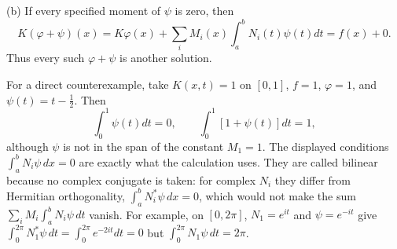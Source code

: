 (b) If every specified moment of $\psi$ is zero, then
\[
K(\varphi+\psi)(x)
=K\varphi(x)+\sum_iM_i(x)\int_a^bN_i(t)\psi(t)dt
=f(x)+0.
\]
Thus every such $\boxed{\varphi+\psi}$ is another solution.

For a direct counterexample, take $K(x,t)=1$ on $[0,1]$,
$f=1$, $\varphi=1$, and $\psi(t)=t-\tfrac12$. Then
\[
\int_0^1\psi(t)dt=0,\qquad
\int_0^1[1+\psi(t)]dt=1,
\]
although $\psi$ is not in the span of the constant $M_1=1$.
The displayed conditions $\int_a^bN_i\psi\,dx=0$ are exactly what the
calculation uses. They are called bilinear because no complex conjugate
is taken: for complex $N_i$ they differ from Hermitian orthogonality,
$\int_a^bN_i^*\psi\,dx=0$, which would not make the sum
$\sum_iM_i\int_a^bN_i\psi\,dt$ vanish. For example, on $[0,2\pi]$,
$N_1=e^{it}$ and $\psi=e^{-it}$ give $\int_0^{2\pi}N_1^*\psi\,dt
=\int_0^{2\pi}e^{-2it}dt=0$ but $\int_0^{2\pi}N_1\psi\,dt=2\pi$.


